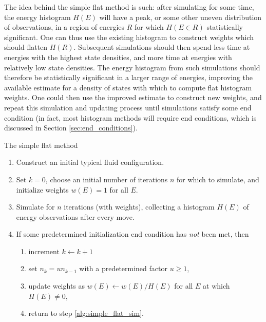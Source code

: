 \documentclass[11pt]{article}
\newcommand{\p}[1]{\left(#1\right)} %
\newenvironment{alg}
{\hrulefill\begin{enumerate}}
{\end{enumerate}\hrulefill}
\begin{document}
The idea behind the simple flat method is such: after simulating for
some time, the energy histogram $H\p{E}$ will have a peak, or some
other uneven distribution of observations, in a region of energies $R$
for which $H\p{E\in R}$ statistically significant. One can thus use
the existing histogram to construct weights which should flatten
$H\p{R}$. Subsequent simulations should then spend less time at
energies with the highest state densities, and more time at energies
with relatively low state densities. The energy histogram from such
simulations should therefore be statistically significant in a larger
range of energies, improving the available estimate for a density of
states with which to compute flat histogram weights. One could then
use the improved estimate to construct new weights, and repeat this
simulation and updating process until simulations satisfy some end
condition (in fact, most histogram methods will require end
conditions, which is discussed in Section \ref{sec:end_conditions}).

\begin{algorithm}[!b]
  \caption{The simple flat method}
  \label{alg:simple_flat}
  \begin{alg}

  \item Construct an initial typical fluid configuration.

  \item Set $k=0$, choose an initial number of iterations $n$ for
    which to simulate, and initialize weights $w\p{E}=1$ for all $E$.

  \item Simulate for $n$ iterations (with weights), collecting a
    histogram $H\p{E}$ of energy observations after every move.
    \label{alg:simple_flat_sim}

  \item If some predetermined initialization end condition has
    \emph{not} been met, then
    \begin{enumerate}
    \item increment $k\leftarrow k+1$
    \item set $n_k=un_{k-1}$ with a predetermined factor $u\ge1$,
      \label{alg:simple_flat_f}
    \item update weights as $w\p{E}\leftarrow w\p{E}/H\p{E}$ for all
      $E$ at which $H\p{E}\ne0$,
      \label{alg:simple_flat_weight_update}
    \item return to step \ref{alg:simple_flat_sim}.
    \end{enumerate}

  \end{alg}
\end{algorithm}
\end{document}
